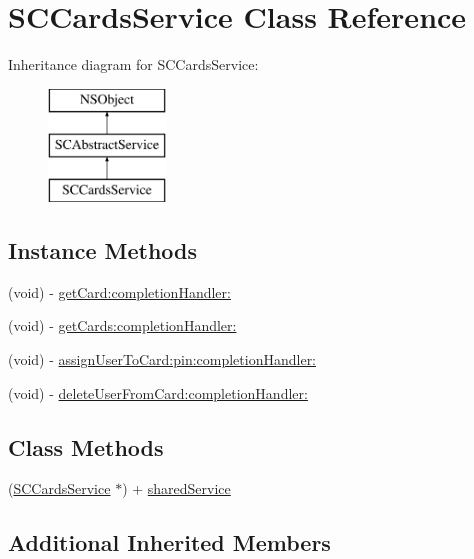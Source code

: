 \hypertarget{interface_s_c_cards_service}{}\section{S\+C\+Cards\+Service Class Reference}
\label{interface_s_c_cards_service}
Inheritance diagram for S\+C\+Cards\+Service\+:\begin{figure}[H]
\begin{center}
\leavevmode
\includegraphics[height=3.000000cm]{interface_s_c_cards_service}
\end{center}
\end{figure}
\subsection*{Instance Methods}
\begin{DoxyCompactItemize}
\item 
(void) -\/ \hyperlink{interface_s_c_cards_service_ae34dded67943dff28140edafd0f94019}{get\+Card\+:completion\+Handler\+:}
\item 
(void) -\/ \hyperlink{interface_s_c_cards_service_a02c2257ecdadb8a496183c7b17b0fc90}{get\+Cards\+:completion\+Handler\+:}
\item 
(void) -\/ \hyperlink{interface_s_c_cards_service_a57dd58e201c3985c08f6d260828727ff}{assign\+User\+To\+Card\+:pin\+:completion\+Handler\+:}
\item 
(void) -\/ \hyperlink{interface_s_c_cards_service_ad1179e966566cd5c0cbc2ff06d91af83}{delete\+User\+From\+Card\+:completion\+Handler\+:}
\end{DoxyCompactItemize}
\subsection*{Class Methods}
\begin{DoxyCompactItemize}
\item 
(\hyperlink{interface_s_c_cards_service}{S\+C\+Cards\+Service} $\ast$) + \hyperlink{interface_s_c_cards_service_aa83640b09d29f94345937d1e9bf57673}{shared\+Service}
\end{DoxyCompactItemize}
\subsection*{Additional Inherited Members}


